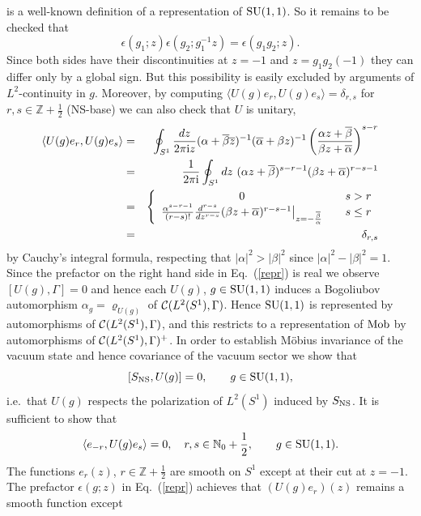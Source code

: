 \documentclass[10pt,a4paper]{article}
\begin{document}
\begin{appendix}
is a well-known definition of a representation
of ${\rm SU}(1,1)$. So it remains to be checked
that
\[ \epsilon(g_1;z) \epsilon(g_2;g_1^{-1}z)
=\epsilon(g_1g_2;z). \]
Since both sides have their discontinuities at
$z=-1$ and $z=g_1g_2(-1)$ they can differ only
by a global sign. But this possibility is easily
excluded by arguments of $L^2$-continuity in
$g$. Moreover,
by computing $\langle U(g) e_r, U(g) e_s \rangle
= \delta_{r,s}$ for $r,s\in\mathbb{Z}+\frac{1}{2}$
(NS-base) we can also check that $U$ is unitary,
\begin{eqnarray*}
\langle U(g) e_r , U(g) e_s \rangle &=&
\oint_{S^1} \frac{dz}{2\pi{\rm i} z}
(\alpha + \overline{\beta}\overline{z})^{-1}
(\overline{\alpha} + \beta z)^{-1}
\left( \frac{\alpha z + \overline{\beta}}
{\beta z + \overline{\alpha}} \right)^{s-r} \\
&=& \frac{1}{2\pi{\rm i}} \oint_{S^1} dz \,\,
(\alpha z + \overline{\beta})^{s-r-1}
(\beta z + \overline{\alpha})^{r-s-1} \\
&=& \left\{ \begin{array}{cc}
0 & \quad s>r \\
\frac{\alpha^{s-r-1}}{(r-s)!}
\frac{d^{r-s}}{dz^{r-s}}(\beta z+
\overline{\alpha})^{r-s-1}\big|_{z=-
\frac{\overline{\beta}}{\alpha}} &
\quad s \le r \end{array} \right. \\
&=& \delta_{r,s}
\end{eqnarray*}
by Cauchy's integral formula, respecting that
$|\alpha|^2>|\beta|^2$ since $|\alpha|^2-
|\beta|^2=1$. Since the prefactor
on the right hand side in Eq.~(\ref{repr})
is real we observe $[U(g),\Gamma]=0$ and hence
each $U(g)$, $g\in{\rm SU}(1,1)$ induces a
Bogoliubov automorphism $\alpha_g=\varrho_{U(g)}$
of ${\cal C}(L^2(S^1),\Gamma)$. Hence
${\rm SU}(1,1)$ is represented by automorphisms
of ${\cal C}(L^2(S^1),\Gamma)$, and this restricts
to a representation of ${\rm Mob}$ by automorphisms
of ${\cal C}(L^2(S^1),\Gamma)^+$.
In order to establish
M{\"o}bius invariance of the vacuum state and hence
covariance of the vacuum sector we show that
\[ [S_{\rm NS},U(g)]=0,\qquad g\in{\rm SU}(1,1),\]
i.e.~that $U(g)$ respects the polarization of
$L^2(S^1)$ induced by $S_{\rm NS}$. It is
sufficient to show that
\[ \langle e_{-r},U(g) e_s \rangle =0,
\quad r,s\in\mathbb{N}_0 + \frac{1}{2}, \qquad
g \in {\rm SU}(1,1). \]
The functions $e_r(z)$, $r\in\mathbb{Z}+\frac{1}{2}$
are smooth on $S^1$ except at their cut at
$z=-1$. The prefactor $\epsilon(g;z)$ in
Eq.~(\ref{repr}) achieves that
$(U(g)e_r)(z)$ remains a smooth function except

\end{appendix}
\end{document}
